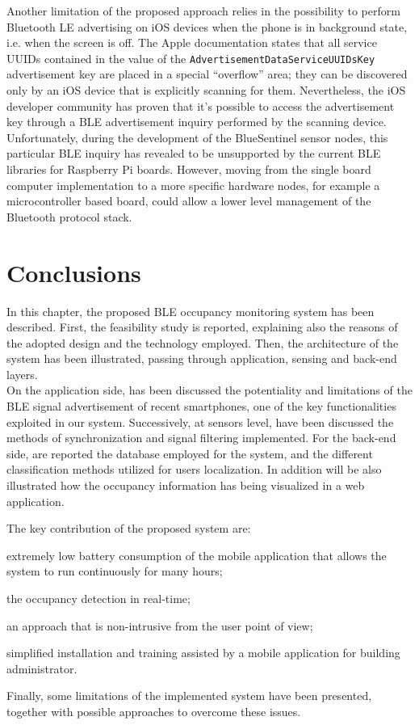\smallskip
Another limitation of the proposed approach relies in the possibility to perform Bluetooth LE advertising on iOS devices when the phone is in background state, i.e. when the screen is off.
The Apple documentation states that all service UUIDs contained in the value of the \verb|AdvertisementDataServiceUUIDsKey| advertisement key are placed in a special “overflow” area; they can be discovered only by an iOS device that is explicitly scanning for them. Nevertheless, the iOS developer community has proven that it's possible to access the advertisement key through a BLE advertisement inquiry performed by the scanning device. Unfortunately, during the development of the BlueSentinel sensor nodes, this particular BLE inquiry has revealed to be unsupported by the current BLE libraries for Raspberry Pi boards. However, moving from the single board computer implementation to a more specific hardware nodes, for example a microcontroller based board, could allow a lower level management of the Bluetooth protocol stack.

\section{Conclusions}
\label{sec:conclusion}

In this chapter, the proposed BLE occupancy monitoring system has been described. First, the feasibility study is reported, explaining also the reasons of the adopted design and the technology employed. Then, the architecture of the system has been illustrated, passing through application, sensing and back-end layers.\\
On the application side, has been discussed the potentiality and limitations of the BLE signal advertisement of recent smartphones, one of the key functionalities exploited in our system. Successively, at sensors level, have been discussed the methods of synchronization and signal filtering implemented. For the back-end side, are reported the database employed for the system, and the different classification methods utilized for users localization. In addition will be also illustrated how the occupancy information has being visualized in a web application.

The key contribution of the proposed system are:
\begin{enumerate*}[label={\textbf{(\arabic*)}}]
\item extremely low battery consumption of the mobile application that allows the system to run continuously for many hours;
\item the occupancy detection in real-time;
\item an approach that is non-intrusive from the user point of view;
\item simplified installation and training assisted by a mobile application for building administrator.
\end{enumerate*}

Finally, some limitations of the implemented system have been presented, together with possible approaches to overcome these issues.

%
